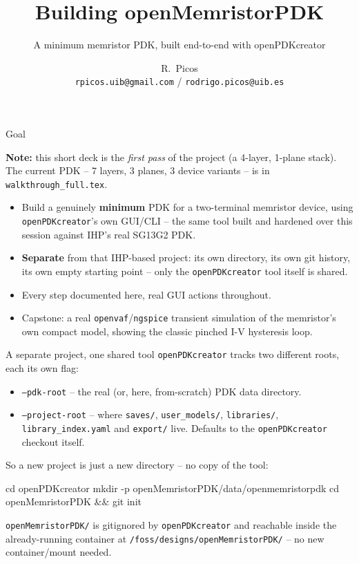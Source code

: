 \documentclass[aspectratio=169]{beamer}
\title{Building openMemristorPDK}
\subtitle{A minimum memristor PDK, built end-to-end with openPDKcreator}
\author{R.~Picos\\{\small\texttt{rpicos.uib@gmail.com} / \texttt{rodrigo.picos@uib.es}}}
\institute{Project PID2025-170062NB (MemFRAME) funded by\\MICIU/AEI/10.13039/501100011033}
\date{}
\begin{document}
\frame{\titlepage}

\begin{frame}{Goal}
{\footnotesize\textbf{Note:} this short deck is the \emph{first pass} of the
project (a 4-layer, 1-plane stack). The current PDK -- 7 layers, 3
planes, 3 device variants -- is in \texttt{walkthrough\_full.tex}.\par}
\begin{itemize}
  \item Build a genuinely \textbf{minimum} PDK for a two-terminal memristor device,
        using \texttt{openPDKcreator}'s own GUI/CLI -- the same tool built and
        hardened over this session against IHP's real SG13G2 PDK.
  \item \textbf{Separate} from that IHP-based project: its own directory,
        its own git history, its own empty starting point -- only the
        \texttt{openPDKcreator} tool itself is shared.
  \item Every step documented here, real GUI actions throughout.
  \item Capstone: a real \texttt{openvaf}/\texttt{ngspice} transient
        simulation of the memristor's own compact model, showing the
        classic pinched I-V hysteresis loop.
\end{itemize}
\end{frame}

\begin{frame}[fragile]{A separate project, one shared tool}
\texttt{openPDKcreator} tracks two different roots, each its own flag:
\begin{itemize}
  \item \texttt{--pdk-root} -- the real (or, here, from-scratch) PDK data
        directory.
  \item \texttt{--project-root} -- where \texttt{saves/},
        \texttt{user\_models/}, \texttt{libraries/},
        \texttt{library\_index.yaml} and \texttt{export/} live. Defaults
        to the \texttt{openPDKcreator} checkout itself.
\end{itemize}
\vspace{0.5em}
So a new project is just a new directory -- no copy of the tool:
\begin{cli}
cd openPDKcreator
mkdir -p openMemristorPDK/data/openmemristorpdk
cd openMemristorPDK && git init
\end{cli}
\texttt{openMemristorPDK/} is gitignored by \texttt{openPDKcreator} and
reachable inside the already-running container at
\texttt{/foss/designs/openMemristorPDK/} -- no new container/mount needed.
\end{frame}
\end{document}
